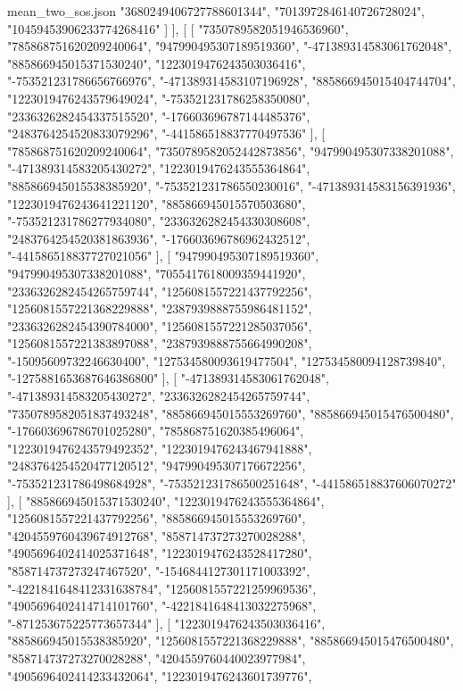 \begin{filecontents*}[overwrite]{mean_two_sos.json}
    "3680249406727788601344",
    "7013972846140726728024",
    "10459453906233774268416"
   ]
  ],
  [
   [
    "7350789582051946536960",
    "785868751620209240064",
    "947990495307189519360",
    "-471389314583061762048",
    "885866945015371530240",
    "1223019476243503036416",
    "-753521231786656766976",
    "-471389314583107196928",
    "885866945015404744704",
    "1223019476243579649024",
    "-753521231786258350080",
    "2336326282454337515520",
    "-176603696787144485376",
    "2483764254520833079296",
    "-441586518837770497536"
   ],
   [
    "785868751620209240064",
    "7350789582052442873856",
    "947990495307338201088",
    "-471389314583205430272",
    "1223019476243555364864",
    "885866945015538385920",
    "-753521231786550230016",
    "-471389314583156391936",
    "1223019476243641221120",
    "885866945015570503680",
    "-753521231786277934080",
    "2336326282454330308608",
    "2483764254520381863936",
    "-176603696786962432512",
    "-441586518837727021056"
   ],
   [
    "947990495307189519360",
    "947990495307338201088",
    "7055417618009359441920",
    "2336326282454265759744",
    "1256081557221437792256",
    "1256081557221368229888",
    "2387939888755986481152",
    "2336326282454390784000",
    "1256081557221285037056",
    "1256081557221383897088",
    "2387939888755664990208",
    "-15095609732246630400",
    "127534580093619477504",
    "127534580094128739840",
    "-1275881653687646386800"
   ],
   [
    "-471389314583061762048",
    "-471389314583205430272",
    "2336326282454265759744",
    "7350789582051837493248",
    "885866945015553269760",
    "885866945015476500480",
    "-176603696786701025280",
    "785868751620385496064",
    "1223019476243579492352",
    "1223019476243467941888",
    "2483764254520477120512",
    "947990495307176672256",
    "-753521231786498684928",
    "-753521231786500251648",
    "-441586518837606070272"
   ],
   [
    "885866945015371530240",
    "1223019476243555364864",
    "1256081557221437792256",
    "885866945015553269760",
    "4204559760439674912768",
    "858714737273270028288",
    "4905696402414025371648",
    "1223019476243528417280",
    "858714737273247467520",
    "-1546844127301171003392",
    "-4221841648412331638784",
    "1256081557221259969536",
    "4905696402414714101760",
    "-4221841648413032275968",
    "-871253675225773657344"
   ],
   [
    "1223019476243503036416",
    "885866945015538385920",
    "1256081557221368229888",
    "885866945015476500480",
    "858714737273270028288",
    "4204559760440023977984",
    "4905696402414233432064",
    "1223019476243601739776",

\end{filecontents*}
